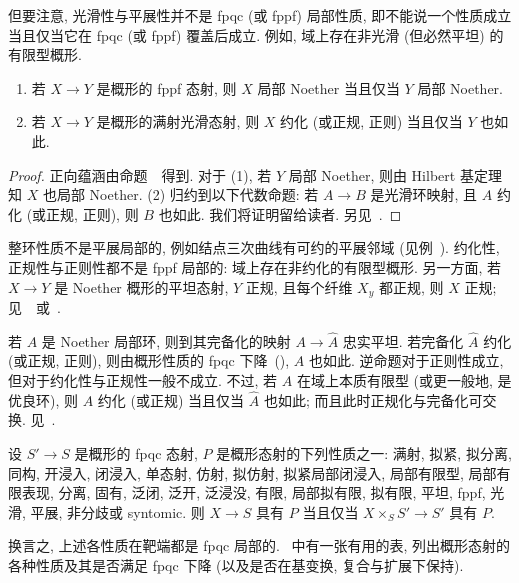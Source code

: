 但要注意, 光滑性与平展性并不是 fpqc (或 fppf) 局部性质, 即不能说一个性质成立当且仅当它在 fpqc (或 fppf) 覆盖后成立. 例如, 域上存在非光滑 (但必然平坦) 的有限型概形.
\begin{proposition}\label{src:3.1.23}
\begin{enumerate}
\item 若 $X\to Y$ 是概形的 fppf 态射, 则 $X$ 局部 Noether 当且仅当 $Y$ 局部 Noether.
\item 若 $X\to Y$ 是概形的满射光滑态射, 则 $X$ 约化 (或正规, 正则) 当且仅当 $Y$ 也如此.
\end{enumerate}
\end{proposition}
\begin{proof}
正向蕴涵由命题~~得到. 对于 (1), 若 $Y$ 局部 Noether, 则由 Hilbert 基定理知 $X$ 也局部 Noether. (2) 归约到以下代数命题: 若 $A\to B$ 是光滑环映射, 且 $A$ 约化 (或正规, 正则), 则 $B$ 也如此. 我们将证明留给读者. 另见~\cite[Tag 034D]{SP}.
\end{proof}
\begin{remark}\label{src:3.1.24}
整环性质不是平展局部的, 例如结点三次曲线有可约的平展邻域 (见例~). 约化性, 正规性与正则性都不是 fppf 局部的: 域上存在非约化的有限型概形. 另一方面, 若 $X\to Y$ 是 Noether 概形的平坦态射, $Y$ 正规, 且每个纤维 $X_y$ 都正规, 则 $X$ 正规; 见~\cite[IV2.6.5.4]{EGA}~或~\cite[Tag 0C22]{SP}.
\end{remark}
\begin{remark}\label{src:3.1.25}
若 $A$ 是 Noether 局部环, 则到其完备化的映射 $A\to\widehat A$ 忠实平坦. 若完备化 $\widehat A$ 约化 (或正规, 正则), 则由概形性质的 fpqc 下降~(), $A$ 也如此. 逆命题对于正则性成立, 但对于约化性与正规性一般不成立. 不过, 若 $A$ 在域上本质有限型 (或更一般地, 是优良环), 则 $A$ 约化 (或正规) 当且仅当 $\widehat A$ 也如此; 而且此时正规化与完备化可交换. 见~\cite[Tags 07NZ, 0C23]{SP}.
\end{remark}
\begin{proposition}\label{src:3.1.26}
设 $S'\to S$ 是概形的 fpqc 态射, $P$ 是概形态射的下列性质之一: 满射, 拟紧, 拟分离, 同构, 开浸入, 闭浸入, 单态射, 仿射, 拟仿射, 拟紧局部闭浸入, 局部有限型, 局部有限表现, 分离, 固有, 泛闭, 泛开, 泛浸没, 有限, 局部拟有限, 拟有限, 平坦, fppf, 光滑, 平展, 非分歧或 syntomic. 则 $X\to S$ 具有 $P$ 当且仅当 $X\times_S S'\to S'$ 具有 $P$.
\end{proposition}
换言之, 上述各性质在靶端都是 fpqc 局部的. \cite[第 305--306 页]{Poo17}~中有一张有用的表, 列出概形态射的各种性质及其是否满足 fpqc 下降 (以及是否在基变换, 复合与扩展下保持).
